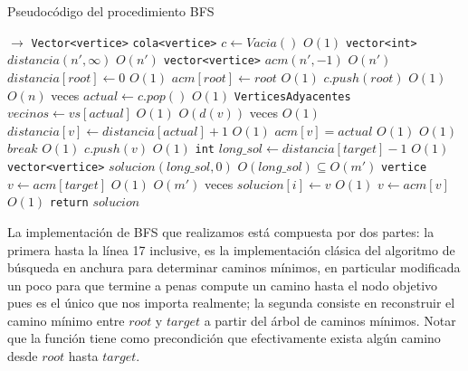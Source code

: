 \begin{algorithm}[H]
  \begin{algorithmic}[1]
  \caption{Pseudocódigo del procedimiento BFS}
  \label{algo:1-1}
    $\rightarrow$ \texttt{Vector<vertice>}
    	\State \texttt{cola<vertice>} $c \gets Vacia()$
    	\Comment $O(1)$
    	\State \texttt{vector<int>} $distancia(n', \infty)$
    	\Comment $O(n')$
    	\State \texttt{vector<vertice>} $acm(n', -1)$
    	\Comment $O(n')$
    	\State $distancia[root]\gets 0$
    	\Comment $O(1)$
    	\State $acm[root]\gets root$
    	\Comment $O(1)$
    	\State $c.push(root)$
    	\Comment $O(1)$
    		\Comment $O(n)$ veces
    		\State $actual\gets c.pop()$
    		\Comment $O(1)$
    		\State \texttt{VerticesAdyacentes} $vecinos\gets vs[actual]$
    		\Comment $O(1)$
    		\Comment $O(d(v))$ veces
    			\Comment $O(1)$
    				\State $distancia[v]\gets distancia[actual] + 1$
    				\Comment $O(1)$
    				\State $acm[v] = actual$
    				\Comment $O(1)$
    				\Comment $O(1)$
    					\State $break$
    					\Comment $O(1)$
    				\EndIf
    				\State $c.push(v)$
    				\Comment $O(1)$
    			\EndIf
    		\EndFor
    	\EndWhile
    	\State \texttt{int} $long\_sol\gets distancia[target]-1$
    	\Comment $O(1)$
    	\State \texttt{vector<vertice>} $solucion(long\_sol, 0)$
    	\Comment $O(long\_sol)\subseteq O(m')$
    	\State \texttt{vertice} $v\gets acm[target]$
    	\Comment $O(1)$
    	\Comment $O(m')$ veces
    		\State $solucion[i]\gets v$
    		\Comment $O(1)$
    		\State $v\gets acm[v]$
    		\Comment $O(1)$
    	\EndFor
    	\State \texttt{return} $solucion$
		\EndProcedure
	\end{algorithmic}
\end{algorithm}

La implementación de BFS que realizamos está compuesta por dos partes: la primera hasta la línea 17 inclusive, es la implementación clásica del algoritmo de búsqueda en anchura para determinar caminos mínimos, en particular modificada un poco para que termine a penas compute un camino hasta el nodo objetivo pues es el único que nos importa realmente; la segunda consiste en reconstruir el camino mínimo entre $root$ y $target$ a partir del árbol de caminos mínimos. Notar que la función tiene como precondición que efectivamente exista algún camino desde $root$ hasta $target$.

